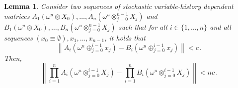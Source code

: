 \documentclass[a4paper,reqno]{amsart}
\newtheorem{lemma}[theorem]{Lemma}
\newcommand{\norm}[1]{\left\lVert #1 \right\rVert}
\begin{document}
\begin{lemma}
Consider two sequences of stochastic variable-history dependent matrices $A_1(\omega^u\otimes X_0),\ldots, A_n(\omega^u\otimes_{j=0}^{n-1}X_j)$ and $B_1(\omega^u\otimes X_0),\ldots, B_n(\omega^u\otimes_{j=0}^{n-1}X_j)$ such that for all $i\in\{1,\ldots,n\}$ and all sequences $(x_0\equiv\emptyset),x_1,\ldots,x_{n-1}$, it holds that
\begin{equation*}
\norm{A_i(\omega^u\oplus_{j=0}^{i-1}x_j) - B_i(\omega^u\oplus_{j=0}^{i-1}x_j)}<c\,.
\end{equation*}
Then,
\begin{equation*}
\norm{\prod_{i=1}^n A_i(\omega^u\otimes_{j=0}^{i-1}X_j) - \prod_{i=1}^n B_i(\omega^u\otimes_{j=0}^{i-1}X_j)} < nc\,.
\end{equation*}
\end{lemma}
\end{document}
